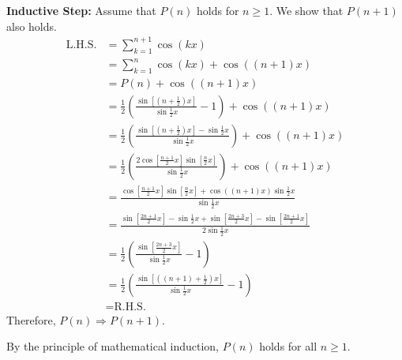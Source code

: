 \documentclass[answers]{exam}
\begin{document}
\begin{questions}
\begin{parts}
\begin{psol}
            \textbf{Inductive Step:} Assume that $P(n)$ holds for $n\geq 1$. We show that $P(n+1)$ also holds.
            \begin{align*}
                \text{L.H.S.} &= \sum_{k=1}^{n+1} \cos(kx) \\
                &= \sum_{k=1}^n \cos(kx) + \cos\left((n+1)x\right) \\
                &= P(n) + \cos\left((n+1)x\right) \\
                &= \frac{1}{2}\left(\frac{\sin\left[\left(n+\frac{1}{2}\right)x\right]}{\sin\frac{1}{2}x}-1\right) + \cos\left((n+1)x\right) \\
                &= \frac{1}{2}\left(\frac{\sin\left[\left(n+\frac{1}{2}\right)x\right]-\sin\frac{1}{2}x}{\sin\frac{1}{2}x}\right) + \cos\left((n+1)x\right) \\
                &= \frac{1}{2}\left(\frac{2\cos\left[\frac{n+1}{2}x\right]\sin\left[\frac{n}{2}x\right]}{\sin\frac{1}{2}x}\right) + \cos\left((n+1)x\right) \\
                &= \frac{\cos\left[\frac{n+1}{2}x\right]\sin\left[\frac{n}{2}x\right] + \cos\left((n+1)x\right)\sin\frac{1}{2}x}{\sin\frac{1}{2}x} \\
                &= \frac{\sin\left[\frac{2n+1}{2}x\right]-\sin\frac{1}{2}x+\sin\left[\frac{2n+3}{2}x\right]-\sin\left[\frac{2n+1}{2}x\right]}{2\sin\frac{1}{2}x} \\
                &= \frac{1}{2}\left(\frac{\sin\left[\frac{2n+3}{2}x\right]}{\sin\frac{1}{2}x}-1\right) \\
                &= \frac{1}{2}\left(\frac{\sin\left[\left(\left(n+1\right)+\frac{1}{2}\right)x\right]}{\sin\frac{1}{2}x}-1\right) \\
                &= \text{R.H.S.}
            \end{align*}
            Therefore, $P(n) \Rightarrow P(n+1)$.

            By the principle of mathematical induction, $P(n)$ holds for all $n\geq 1$.
        \end{psol}

        \newpage


\end{parts}
\end{questions}
\end{document}
